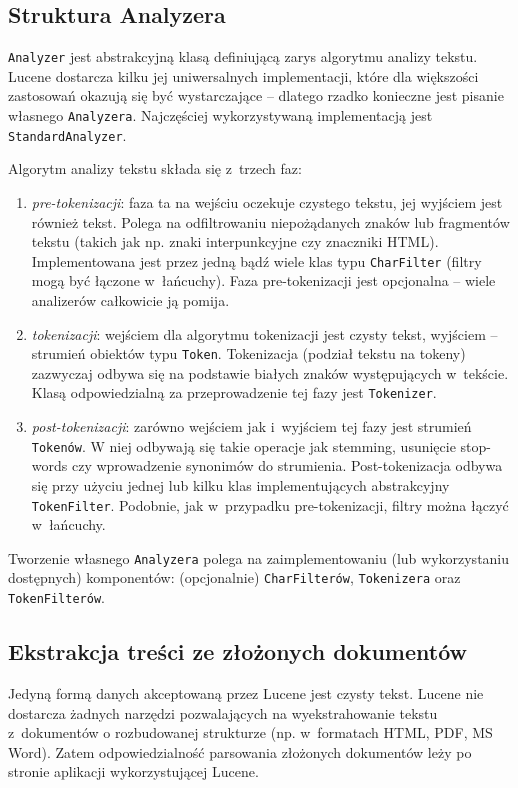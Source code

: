 \subsection{Struktura Analyzera}

\texttt{Analyzer} jest abstrakcyjną klasą definiującą zarys algorytmu analizy tekstu. Lucene dostarcza kilku jej uniwersalnych implementacji, które dla większości zastosowań okazują się być wystarczające -- dlatego rzadko konieczne jest pisanie własnego \texttt{Analyzera}. Najczęściej wykorzystywaną implementacją jest \texttt{StandardAnalyzer}.

Algorytm analizy tekstu składa się z~trzech faz:
\begin{enumerate}
 \item \emph{pre-tokenizacji}: faza ta na wejściu oczekuje czystego tekstu, jej wyjściem jest również tekst. Polega na odfiltrowaniu niepożądanych znaków lub fragmentów tekstu (takich jak np. znaki interpunkcyjne czy znaczniki HTML). Implementowana jest przez jedną bądź wiele klas typu \texttt{CharFilter} (filtry mogą być łączone w~łańcuchy). Faza pre-tokenizacji jest opcjonalna -- wiele analizerów całkowicie ją pomija.
 \item \emph{tokenizacji}: wejściem dla algorytmu tokenizacji jest czysty tekst, wyjściem -- strumień obiektów typu \texttt{Token}. Tokenizacja (podział tekstu na tokeny) zazwyczaj odbywa się na podstawie białych znaków występujących w~tekście. Klasą odpowiedzialną za przeprowadzenie tej fazy jest \texttt{Tokenizer}.
 \item \emph{post-tokenizacji}: zarówno wejściem jak i~wyjściem tej fazy jest strumień \texttt{Tokenów}. W niej odbywają się takie operacje jak stemming, usunięcie stop-words czy wprowadzenie synonimów do strumienia. Post-tokenizacja odbywa się przy użyciu  jednej lub kilku klas implementujących abstrakcyjny \texttt{TokenFilter}. Podobnie, jak w~przypadku pre-tokenizacji, filtry można łączyć w~łańcuchy.
\end{enumerate}

Tworzenie własnego \texttt{Analyzera} polega na zaimplementowaniu (lub wykorzystaniu dostępnych) komponentów: (opcjonalnie) \texttt{CharFilterów}, \texttt{Tokenizera} oraz \texttt{TokenFilterów}. 

\subsection{Ekstrakcja treści ze złożonych dokumentów}

Jedyną formą danych akceptowaną przez Lucene jest czysty tekst. Lucene nie dostarcza żadnych narzędzi pozwalających na wyekstrahowanie tekstu z~dokumentów o rozbudowanej strukturze (np. w~formatach HTML, PDF, MS Word). Zatem odpowiedzialność parsowania złożonych dokumentów leży po stronie aplikacji wykorzystującej Lucene. 

